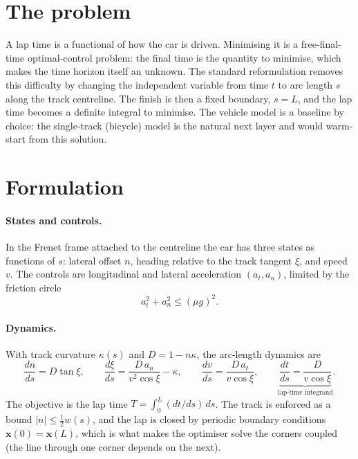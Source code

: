 \documentclass[11pt,a4paper]{article}
\begin{document}
\section{The problem}
A lap time is a functional of how the car is driven. Minimising it is a free-final-time
optimal-control problem: the final time is the quantity to minimise, which makes the time horizon
itself an unknown. The standard reformulation removes this difficulty by changing the independent
variable from time $t$ to arc length $s$ along the track centreline. The finish is then a fixed
boundary, $s=L$, and the lap time becomes a definite integral to minimise. The vehicle model is a baseline by
choice: the single-track (bicycle) model is the natural next layer and would warm-start from this
solution.

\section{Formulation}
\paragraph{States and controls.} In the Frenet frame attached to the centreline the car has three
states as functions of $s$: lateral offset $n$, heading relative to the track tangent $\xi$, and
speed $v$. The controls are longitudinal and lateral acceleration $(a_t,a_n)$, limited by the
friction circle
\begin{equation}
  a_t^2 + a_n^2 \le (\mu g)^2 .
  \label{eq:friction}
\end{equation}

\paragraph{Dynamics.} With track curvature $\kappa(s)$ and $D = 1 - n\kappa$, the arc-length
dynamics are
\begin{equation}
  \frac{dn}{ds} = D\tan\xi,\qquad
  \frac{d\xi}{ds} = \frac{D\,a_n}{v^2\cos\xi} - \kappa,\qquad
  \frac{dv}{ds} = \frac{D\,a_t}{v\cos\xi},\qquad
  \underbrace{\frac{dt}{ds} = \frac{D}{v\cos\xi}}_{\text{lap-time integrand}} .
  \label{eq:dyn}
\end{equation}
The objective is the lap time $T = \int_0^L (dt/ds)\,ds$. The track is enforced as a bound
$|n| \le \tfrac12 w(s)$, and the lap is closed by periodic boundary conditions
$\mathbf{x}(0)=\mathbf{x}(L)$, which is what makes the optimiser solve the corners coupled (the
line through one corner depends on the next).
\end{document}

